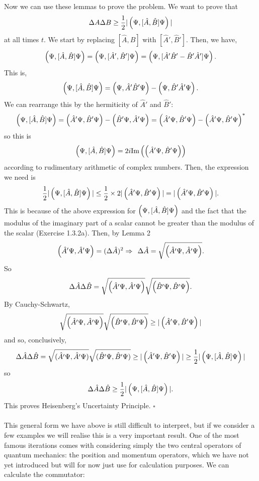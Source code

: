 Now we can use these lemmas to prove the problem. We want to prove that 
$$
\Delta{A}\Delta{B}\geq\frac{1}{2}|\left(\Psi,[\hat{A},\hat{B}]\Psi\right)|
$$
at all times $t$. We start by replacing $[\hat{A},\hat{B}]$ with $[\hat{A}',\hat{B}']$. Then, we have,
$$
\left(\Psi,[\hat{A},\hat{B}]\Psi\right)=\left(\Psi,[\hat{A}',\hat{B}']\Psi\right)=\left(\Psi,[\hat{A}'\hat{B}'-\hat{B}'\hat{A}']\Psi\right).
$$
This is, 
$$
\left(\Psi,[\hat{A},\hat{B}]\Psi\right)=\left(\Psi,\hat{A}'\hat{B}'\Psi\right)-\left(\Psi,\hat{B}'\hat{A}'\Psi\right)
.$$
We can rearrange this by the hermiticity of $\hat{A}'$ and $\hat{B}'$:
$$
\left(\Psi,[\hat{A},\hat{B}]\Psi\right)=\left(\hat{A}'\Psi,\hat{B}'\Psi\right)-\left(\hat{B}'\Psi,\hat{A}'\Psi\right)=\left(\hat{A}'\Psi,\hat{B}'\Psi\right)-\left(\hat{A}'\Psi,\hat{B}'\Psi\right)^{\ast}
$$
so this is
$$
\left(\Psi,[\hat{A},\hat{B}]\Psi\right)=2i\text{Im}\left(\left(\hat{A}'\Psi,\hat{B}'\Psi\right)\right)
$$
according to rudimentary arithmetic of complex numbers. Then, the expression we need is
$$
\frac{1}{2}|\left(\Psi,[\hat{A},\hat{B}]\Psi\right)|\leq\frac{1}{2}\times2|\left(\hat{A}'\Psi,\hat{B}'\Psi\right)|=|\left(\hat{A}'\Psi,\hat{B}'\Psi\right)|.
$$
This is because of the above expression for $\left(\Psi,[\hat{A},\hat{B}]\Psi\right)$ and the fact that the modulus of the imaginary part of a scalar cannot be greater than the modulus of the scalar (Exercise 1.3.2a). Then, by Lemma 2
$$
\left(\hat{A}'\Psi,\hat{A}'\Psi\right)=(\Delta\hat{A})^2\Rightarrow\:\:\Delta\hat{A}=\sqrt{\left(\hat{A}'\Psi,\hat{A}'\Psi\right)}.
$$
So 
$$
\Delta\hat{A}\Delta\hat{B}=\sqrt{\left(\hat{A}'\Psi,\hat{A}'\Psi\right)}\sqrt{\left(\hat{B}'\Psi,\hat{B}'\Psi\right)}.
$$
By Cauchy-Schwartz, 
$$
\sqrt{\left(\hat{A}'\Psi,\hat{A}'\Psi\right)}\sqrt{\left(\hat{B}'\Psi,\hat{B}'\Psi\right)}\geq|\left(\hat{A}'\Psi,\hat{B}'\Psi\right)|
$$
and so, conclusively,
$$
\Delta\hat{A}\Delta\hat{B}=\sqrt{(\hat{A}'\Psi,\hat{A}'\Psi)}\sqrt{(\hat{B}'\Psi,\hat{B}'\Psi)}\geq|\left(\hat{A}'\Psi,\hat{B}'\Psi\right)|\geq\frac{1}{2}|\left(\Psi,[\hat{A},\hat{B}]\Psi\right)|
$$
so 
$$
\Delta\hat{A}\Delta\hat{B}\geq\frac{1}{2}|\left(\Psi,[\hat{A},\hat{B}]\Psi\right)|.
$$
This proves Heisenberg's Uncertainty Principle. $\square$
\\\\
This general form we have above is still difficult to interpret, but if we consider a few examples we will realise this is a very important result. One of the most famous iterations comes with considering simply the two central operators of quantum mechanics: the position and momentum operators, which we have not yet introduced but will for now just use for calculation purposes. We can calculate the commutator:
